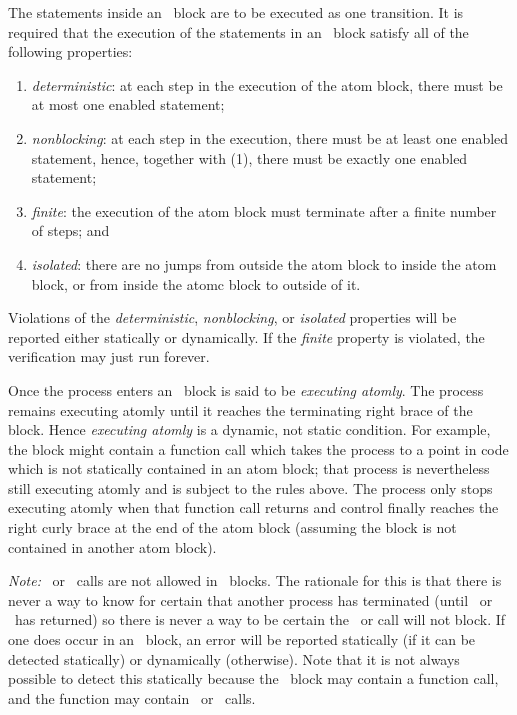 The statements inside an \catom\ block are to be executed as one
transition. It is required that the execution of the statements in an
\catom\ block satisfy all of the following properties:
\begin{enumerate}
\item \emph{deterministic}: at each step in the execution of the atom
  block, there must be at most one enabled statement;
\item \emph{nonblocking}: at each step in the execution, there must be
  at least one enabled statement, hence, together with (1), there must
  be exactly one enabled statement;
\item \emph{finite}: the execution of the atom block must terminate
  after a finite number of steps; and
\item \emph{isolated}: there are no jumps from outside the atom block
  to inside the atom block, or from inside the atomc block to outside
  of it.
\end{enumerate}

Violations of the \emph{deterministic}, \emph{nonblocking}, or
\emph{isolated} properties will be reported either statically or
dynamically.  If the \emph{finite} property is violated, the
verification may just run forever.

Once the process enters an \catom\ block is said to be \emph{executing
  atomly}.  The process remains executing atomly until it reaches the
terminating right brace of the block.  Hence \emph{executing atomly}
is a dynamic, not static condition.  For example, the block might
contain a function call which takes the process to a point in code
which is not statically contained in an atom block; that process is
nevertheless still executing atomly and is subject to the rules above.
The process only stops executing atomly when that function call
returns and control finally reaches the right curly brace at the end
of the atom block (assuming the block is not contained in another atom
block).

\emph{Note:} \cwait\ or \cwaitall\ calls are not allowed in \catom\ blocks.
The rationale for this is that there is never a way to know for
certain that another process has terminated (until \cwait\ or \cwaitall\ has
returned) so there is never a way to be certain the \cwait\ or \cwaitall call
will not block.  If one does occur in an \catom\ block, an error will
be reported statically (if it can be detected statically) or
dynamically (otherwise).  Note that it is not always possible to
detect this statically because the \catom\ block may contain a
function call, and the function may contain \cwait\ or \cwaitall\ calls.

